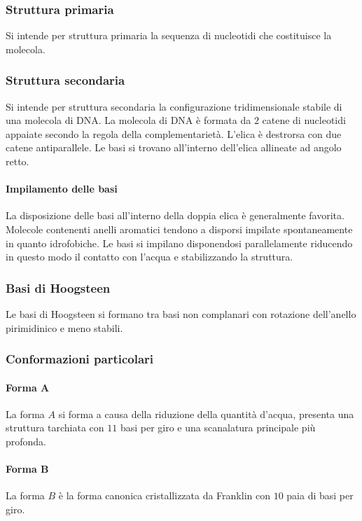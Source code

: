 		\subsubsection{Struttura primaria}
		Si intende per struttura primaria la sequenza di nucleotidi che costituisce la molecola.

		\subsubsection{Struttura secondaria}
		Si intende per struttura secondaria la configurazione tridimensionale stabile di una molecola di DNA.
		La molecola di DNA \`e formata da $2$ catene di nucleotidi appaiate secondo la regola della complementariet\`a.
		L'elica \`e destrorsa con due catene antiparallele.
		Le basi si trovano all'interno dell'elica allineate ad angolo retto.

			\paragraph{Impilamento delle basi}
			La disposizione delle basi all'interno della doppia elica \`e generalmente favorita.
			Molecole contenenti anelli aromatici tendono a disporsi impilate spontaneamente in quanto idrofobiche.
			Le basi si impilano disponendosi parallelamente riducendo in questo modo il contatto con l'acqua e stabilizzando la struttura.

		\subsubsection{Basi di Hoogsteen}
		Le basi di Hoogsteen si formano tra basi non complanari con rotazione dell'anello pirimidinico e meno stabili.

		\subsubsection{Conformazioni particolari}
			
			\paragraph{Forma $\mathbf{A}$}
			La forma $A$ si forma a causa della riduzione della quantit\`a d'acqua, presenta una struttura tarchiata con $11$ basi per giro e una scanalatura principale pi\`u profonda.

			\paragraph{Forma $\mathbf{B}$}
			La forma $B$ \`e la forma canonica cristallizzata da Franklin con $10$ paia di basi per giro.

